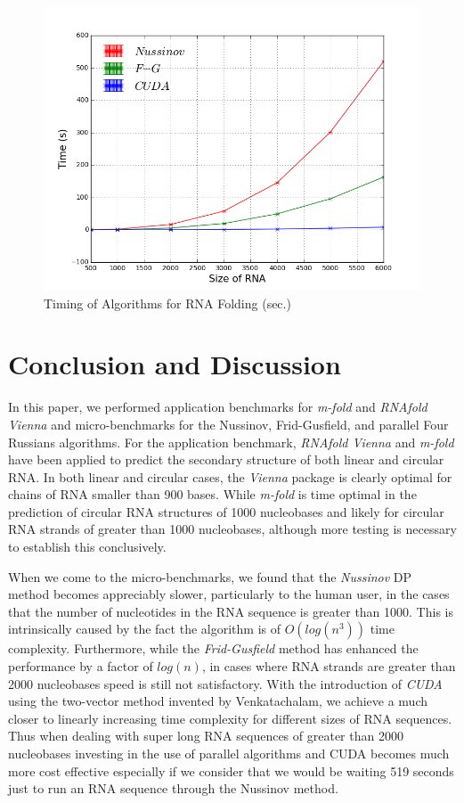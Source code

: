 \documentclass[12pt]{article}
\begin{document}
\begin{figure}[H]
  \centering
  \includegraphics[keepaspectratio, scale=.6]{algorithmGraph.png}
  \caption{Timing of Algorithms for RNA Folding (sec.)}
  \label{fig:timingAlgorithm}
\end{figure}

\section{Conclusion and Discussion}
\par In this paper, we performed application benchmarks for \textit{m-fold} and \textit{RNAfold Vienna} and
micro-benchmarks for the Nussinov, Frid-Gusfield, and parallel Four Russians algorithms. For the
application benchmark, \textit{RNAfold Vienna} and \textit{m-fold} have been applied to predict
the secondary structure of both linear and circular RNA. In both linear and circular cases, the
\textit{Vienna} package is clearly optimal for chains of RNA smaller than 900 bases.  While
\textit{m-fold} is time optimal in the prediction of circular RNA structures of 1000 nucleobases and likely
for circular RNA strands of greater than 1000 nucleobases, although more testing is necessary to establish this conclusively.

\par When we come to the micro-benchmarks, we found that the \textit{Nussinov} DP method becomes
appreciably slower, particularly to the human user, in the cases that the number of nucleotides in the RNA sequence is
greater than 1000. This is intrinsically caused by the fact the algorithm is of $O(log(n^3))$ time complexity.
Furthermore, while the \textit{Frid-Gusfield} method \cite{gusfield} has enhanced the performance by a factor of $log(n)$,
in cases where RNA strands are greater than 2000 nucleobases speed is still not satisfactory. With the introduction
of \textit{CUDA} using the two-vector method invented by Venkatachalam\cite{balaji}, we achieve a much closer
to linearly increasing time complexity for different sizes of RNA sequences. Thus when dealing with super long RNA
sequences of greater than 2000 nucleobases investing in the use of parallel algorithms and CUDA becomes much
more cost effective especially if we consider that we would be waiting 519 seconds just to run an RNA sequence
through the Nussinov method.
\end{document}
